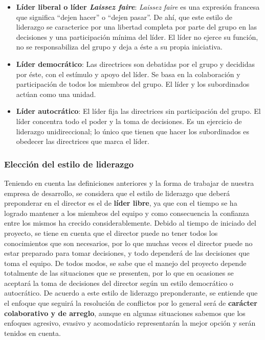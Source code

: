 \begin{itemize}
\item\textbf{Líder liberal o líder \textit{Laissez faire}}:
\textit{Laissez faire} es una expresión francesa que significa ``dejen hacer'' o ``dejen pasar''.
De ahí, que este estilo de liderazgo se caracterice por una libertad completa por parte del grupo en las decisiones y una participación mínima del líder.
El líder no ejerce su función, no se responsabiliza del grupo y deja a éste a su propia iniciativa.

\item\textbf{Líder democrático}:
Las directrices son debatidas por el grupo y decididas por éste, con el estímulo y apoyo del líder.
Se basa en la colaboración y participación de todos los miembros del grupo.
El líder y los subordinados actúan como una unidad.

\item\textbf{Líder autocrático}:
El líder fija las directrices sin participación del grupo.
El líder concentra todo el poder y la toma de decisiones.
Es un ejercicio de liderazgo unidireccional; lo único que tienen que hacer los subordinados es obedecer las directrices que marca el líder.
\end{itemize}

\subsubsection{Elección del estilo de liderazgo}

Teniendo en cuenta las definiciones anteriores y la forma de trabajar de nuestra empresa de desarrollo, se considera que el estilo de liderazgo que deberá preponderar en el director es el de \textbf{líder libre}, ya que con el tiempo se ha logrado mantener a los miembros del equipo y como consecuencia la confianza entre los mismos ha crecido considerablemente.
Debido al tiempo de iniciado del proyecto, se tiene en cuenta que el director puede no tener todos los conocimientos que son necesarios, por lo que muchas veces el director puede no estar preparado para tomar decisiones, y todo dependerá de las decisiones que toma el equipo.
De todos modos, se sabe que el manejo del proyecto depende totalmente de las situaciones que se presenten, por lo que en ocasiones se aceptará la toma de decisiones del director según un estilo democrático o autocrático.
De acuerdo a este estilo de liderazgo preponderante, se entiende que el enfoque que seguirá la resolución de conflictos por lo general será de \textbf{carácter colaborativo y de arreglo}, aunque en algunas situaciones sabemos que los enfoques agresivo, evasivo y acomodaticio representarán la mejor opción y serán tenidos en cuenta. 


